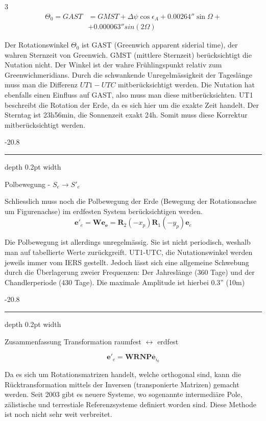 \documentclass[9pt, landscape, fleqn]{scrartcl}
\makeatletter
\renewcommand{\subsubsection}{\@startsection{subsubsection}{1}{0mm}%
{-2\baselineskip}{0.8\baselineskip}%
{\hrule depth 0.2pt width\columnwidth\vspace*{1.2em}\normalsize\bfseries\rmfamily}}
\makeatother
\begin{document}
\begin{multicols*}{3}
\begin{align*}
    \Theta_0 = GAST &= GMST + \Delta \psi \cos \epsilon_A + 0.00264'' \sin \Omega + \\ 
    &+ 0.000063'' sin(2\Omega)
\end{align*}

Der Rotationswinkel $\Theta_0$ ist GAST (Greenwich apparent siderial time), der wahren Sternzeit von Greenwich. GMST (mittlere Sternzeit) berücksichtigt die Nutation nicht. Der Winkel ist der wahre Frühlingspunkt relativ zum Greenwichmeridians. Durch die schwankende Unregelmässigkeit der Tageslänge muss man die Differenz $UT1-UTC$ mitberücksichtigt werden. Die Nutation hat ebenfalls einen Einfluss auf GAST, also muss man diese mitberücksichten. UT1 beschreibt die Rotation der Erde, da es sich hier um die exakte Zeit handelt. Der Sterntag ist 23h56min, die Sonnenzeit exakt 24h. Somit muss diese Korrektur mitberücksichtigt werden.

\subsubsection{Polbewegung - $S_e \rightarrow S'_e$}

Schliesslich muss noch die Polbewegung der Erde (Bewegung der Rotationsachse um Figurenachse) im erdfesten System berücksichtigen werden. 
\begin{equation*}
    \mathbf{e}'_e = \mathbf{W} \mathbf{e_e} = \mathbf{R}_2(-x_p) \mathbf{R}_1(-y_p) \mathbf{e}_e
\end{equation*}

Die Polbewegung ist allerdings unregelmässig. Sie ist nicht periodisch, weshalb man auf tabellierte Werte zurückgreift. UT1-UTC, die Nutationswinkel werden jeweils immer vom IERS gestellt. Jedoch lässt sich eine allgemeine Schwebung durch die Überlagerung zweier Frequenzen: Der Jahreslänge (360 Tage) und der Chandlerperiode (430 Tage). Die maximale Amplitude ist hierbei 0.3'' (10m)

\subsubsection{Zusammenfassung Transformation raumfest $\leftrightarrow$ erdfest}

\begin{equation*}
    \mathbf{e}'_e = \mathbf{WRNP} \overline{\mathbf{e}}_{i_0}
\end{equation*}

Da es sich um Rotationsmatrizen handelt, welche orthogonal sind, kann die Rücktransformation mittels der Inversen (transponierte Matrizen) gemacht werden. Seit 2003 gibt es neuere Systeme, wo sogenannte intermediäre Pole, zälistische und terrestiale Referenzsysteme definiert worden sind. Diese Methode ist noch nicht sehr weit verbreitet.


\end{multicols*}
\end{document}
